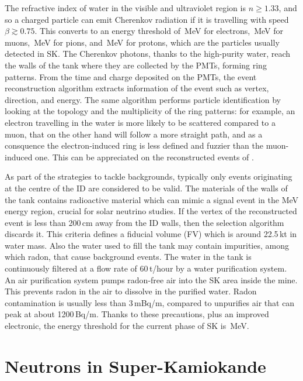 The refractive index of water in the visible and ultraviolet region is $n \geq 1.33$, %
and so a charged particle can emit Cherenkov radiation if it is travelling %
with speed $\beta \gtrsim 0.75$.
This converts to an energy threshold of \,MeV for electrons, \,MeV for muons, %
\,MeV for pions, and \,MeV for protons, which are the particles usually detected in SK.
The Cherenkov photons, thanks to the high-purity water, reach the walls of the tank where they %
are collected by the PMTs, forming ring patterns.
From the time and charge deposited on the PMTs, the event reconstruction algorithm extracts information of the event %
such as vertex, direction, and energy.
The same algorithm performs particle identification by looking at the topology and the multiplicity of the ring patterns: %
for example, an electron travelling in the water is more likely to be scattered compared to a muon, %
that on the other hand will follow a more straight path, and as a consquence %
the electron-induced ring is less defined and fuzzier than the muon-induced one.
This can be appreciated on the reconstructed events of .

As part of the strategies to tackle backgrounds, typically only events originating at the centre %
of the ID are considered to be valid.
The materials of the walls of the tank contains radioactive material which can mimic a signal event %
in the MeV energy region, crucial for solar neutrino studies.
If the vertex of the reconstructed event is less than 200\,cm away from the ID walls, %
then the selection algorithm discards it.
This criteria defines a fiducial volume (FV) which is around 22.5\,kt in water mass.
Also the water used to fill the tank may contain impurities, among which radon, that cause background events.
The water in the tank is continuously filtered at a flow rate of 60\,t/hour by a water purification system.
An air purification system pumps radon-free air into the SK area inside the mine.
This prevents radon in the air to dissolve in the purified water.
Radon contamination is usually less than 3\,mBq/m, compared to unpurifies air that can peak %
at about 1200\,Bq/m.
Thanks to these precautions, plus an improved electronic, the energy threshold for the current phase of %
SK is \,MeV.

\section{Neutrons in Super-Kamiokande}

